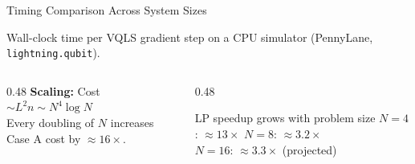 \documentclass{beamer}
\begin{document}
\begin{frame}[shrink=10]{Timing Comparison Across System Sizes}

  Wall-clock time per VQLS gradient step on a CPU simulator
  (PennyLane, \texttt{lightning.qubit}).

  \vspace{4pt}
  \begin{center}
  \renewcommand{\arraystretch}{1.2}
  \end{center}

  \vspace{4pt}
  \begin{columns}
    \begin{column}{0.48\textwidth}
      \textbf{Scaling:} Cost $\sim L^2 n \sim N^4 \log N$ \\
      Every doubling of $N$ increases Case A cost by ${\approx}16\times$.
    \end{column}
    \begin{column}{0.48\textwidth}
      \begin{alertblock}{LP speedup grows with problem size}
        $N=4$: ${\approx}13\times$ \quad
        $N=8$: ${\approx}3.2\times$ \\
        $N=16$: ${\approx}3.3\times$ (projected)
      \end{alertblock}
    \end{column}
  \end{columns}
\end{frame}
\end{document}
